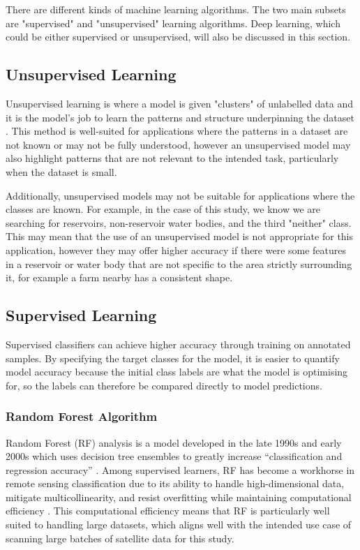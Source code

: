 There are different kinds of machine learning algorithms. The two main subsets are "supervised" and "unsupervised" learning algorithms. Deep learning, which could be either supervised or unsupervised, will also be discussed in this section. 

\subsection{Unsupervised Learning}
Unsupervised learning is where a model is given "clusters" of unlabelled data and it is the model's job to learn the patterns and structure underpinning the dataset \citep{ibm_2021b}. This method is well-suited for applications where the patterns in a dataset are not known or may not be fully understood, however an unsupervised model may also highlight patterns that are not relevant to the intended task, particularly when the dataset is small. 

Additionally, unsupervised models may not be suitable for applications where the classes are known. For example, in the case of this study, we know we are searching for reservoirs, non-reservoir water bodies, and the third "neither" class. This may mean that the use of an unsupervised model is not appropriate for this application, however they may offer higher accuracy if there were some features in a reservoir or water body that are not specific to the area strictly surrounding it, for example a farm nearby has a consistent shape. 

\subsection{Supervised Learning}
Supervised classifiers can achieve higher accuracy through training on annotated samples. By specifying the target classes for the model, it is easier to quantify model accuracy because the initial class labels are what the model is optimising for, so the labels can therefore be compared directly to model predictions.

\subsubsection{Random Forest Algorithm}
Random Forest (RF) analysis is a model developed in the late 1990s and early 2000s which uses decision tree ensembles to greatly increase “classification and regression accuracy” \citep{biau_2012_analysis}. Among supervised learners, RF has become a workhorse in remote sensing classification due to its ability to handle high-dimensional data, mitigate multicollinearity, and resist overfitting while maintaining computational efficiency \citep{do_lenca_lallich_pham_2009}. This computational efficiency means that RF is particularly well suited to handling large datasets, which aligns well with the intended use case of scanning large batches of satellite data for this study. 

